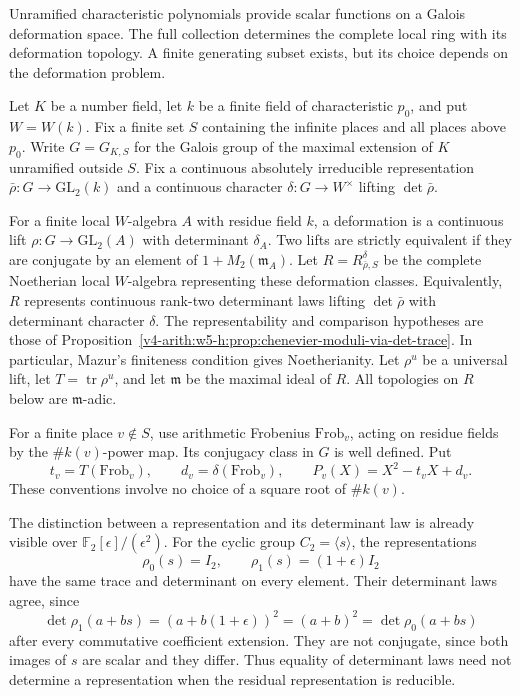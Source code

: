 Unramified characteristic polynomials provide scalar functions on a
Galois deformation space. The full collection determines the complete
local ring with its deformation topology. A finite generating subset
exists, but its choice depends on the deformation problem.

Let $K$ be a number field, let $k$ be a finite field of characteristic
$p_0$, and put $W=W(k)$. Fix a finite set $S$ containing the infinite
places and all places above $p_0$. Write $G=G_{K,S}$ for the Galois
group of the maximal extension of $K$ unramified outside $S$.
Fix a continuous absolutely irreducible representation
$\bar\rho:G\to\mathrm{GL}_2(k)$ and a continuous character
$\delta:G\to W^\times$ lifting $\det\bar\rho$.

For a finite local $W$-algebra $A$ with residue field $k$, a deformation
is a continuous lift $\rho:G\to\mathrm{GL}_2(A)$ with determinant
$\delta_A$. Two lifts are strictly equivalent if they are conjugate
by an element of $1+M_2(\mathfrak m_A)$.
Let $R=R^{\delta}_{\bar\rho,S}$ be the complete Noetherian local
$W$-algebra representing these deformation classes. Equivalently,
$R$ represents continuous rank-two determinant laws lifting
$\det\bar\rho$ with determinant character $\delta$.
The representability and comparison hypotheses are those of
Proposition~\ref{v4-arith:w5-h:prop:chenevier-moduli-via-det-trace}.
In particular, Mazur's finiteness condition gives Noetherianity.
Let $\rho^u$ be a universal lift, let $T=\operatorname{tr}\rho^u$,
and let $\mathfrak m$ be the maximal ideal of $R$.
All topologies on $R$ below are $\mathfrak m$-adic.

For a finite place $v\notin S$, use arithmetic Frobenius
$\mathrm{Frob}_v$, acting on residue fields by the $\#k(v)$-power map.
Its conjugacy class in $G$ is well defined. Put
\[
 t_v=T(\mathrm{Frob}_v),\qquad
 d_v=\delta(\mathrm{Frob}_v),\qquad
 P_v(X)=X^2-t_vX+d_v.
\]
These conventions involve no choice of a square root of $\#k(v)$.

The distinction between a representation and its determinant law is
already visible over $\mathbb F_2[\epsilon]/(\epsilon^2)$. For the cyclic group
$C_2=\langle s\rangle$, the representations
\[
 \rho_0(s)=I_2,\qquad \rho_1(s)=(1+\epsilon)I_2
\]
have the same trace and determinant on every element. Their determinant
laws agree, since
\[
 \det\rho_1(a+bs)=(a+b(1+\epsilon))^2=(a+b)^2
 =\det\rho_0(a+bs)
\]
after every commutative coefficient extension. They are not conjugate,
since both images of $s$ are scalar and they differ. Thus equality of
determinant laws need not determine a representation when the residual
representation is reducible.

